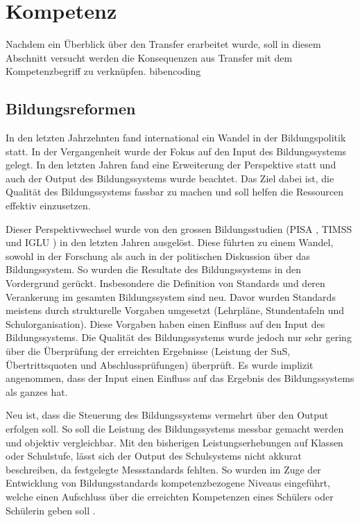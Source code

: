 \section{Kompetenz}

Nachdem ein Überblick über den Transfer erarbeitet wurde, soll in diesem Abschnitt versucht werden die Konsequenzen aus Transfer mit dem Kompetenzbegriff zu verknüpfen.
bibencoding

\subsection{Bildungsreformen}
In den letzten Jahrzehnten fand international ein Wandel in der Bildungspolitik statt. In der Vergangenheit wurde der Fokus auf den Input des Bildungssystems gelegt. In den letzten Jahren fand eine Erweiterung der Perspektive statt und auch der Output des Bildungssystems wurde beachtet. Das Ziel dabei ist, die Qualität des Bildungssystems fassbar zu machen und soll helfen die Ressourcen effektiv einzusetzen.

Dieser Perspektivwechsel wurde von den grossen Bildungsstudien (PISA \citep{PISA-KonsortiumDeuschland2004}, TIMSS \citep{Martin2003} und IGLU \citep{Bos2003}) in den letzten Jahren ausgelöst. Diese führten zu einem Wandel, sowohl in der Forschung als auch in der politischen Diskussion über das Bildungssystem. So wurden die Resultate des Bildungssystems in den Vordergrund gerückt. Insbesondere die Definition von Standards und deren Verankerung im gesamten Bildungssystem sind neu. Davor wurden Standards meistens durch strukturelle Vorgaben umgesetzt (Lehrpläne, Stundentafeln und Schulorganisation). Diese Vorgaben haben einen Einfluss auf den Input des Bildungssystems. Die Qualität des Bildungssystems wurde jedoch nur sehr gering über die Überprüfung der erreichten Ergebnisse (Leistung der SuS, Übertrittsquoten und Abschlussprüfungen) überprüft. Es wurde implizit angenommen, dass der Input einen Einfluss auf das Ergebnis des Bildungssystems als ganzes hat. 

Neu ist, dass die Steuerung des Bildungssystems vermehrt über den Output erfolgen soll. So soll die Leistung des Bildungssystems messbar gemacht werden und objektiv vergleichbar. Mit den bisherigen Leistungserhebungen auf Klassen oder Schulstufe, lässt sich der Output des Schulsystems nicht akkurat beschreiben, da festgelegte Messstandards fehlten. So wurden im Zuge der Entwicklung von Bildungsstandards kompetenzbezogene Niveaus eingeführt, welche einen Aufschluss über die erreichten Kompetenzen eines Schülers oder Schülerin geben soll \citep{Oelkers2008}.


